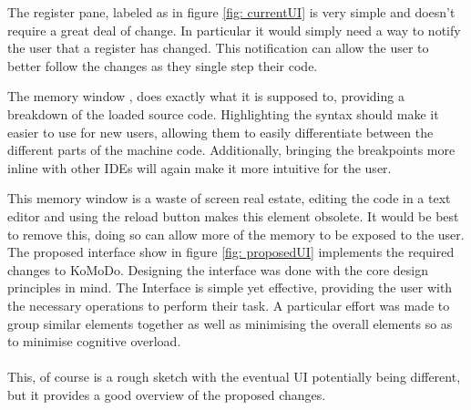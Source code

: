 The register pane, labeled as  in figure \ref{fig: currentUI} is very simple and doesn't require a great deal of change. In particular it would simply need a way to notify the user that a register has changed. This notification can allow the user to better follow the changes as they single step their code.

The memory window , does exactly what it is supposed to, providing a breakdown of the loaded source code. Highlighting the syntax should make it easier to use for new users, allowing them to easily differentiate between the different parts of the machine code. Additionally, bringing the breakpoints more inline with other IDEs will again make it more intuitive for the user.

This memory window is a waste of screen real estate, editing the code in a text editor and using the reload button makes this element obsolete. It would be best to remove this, doing so can allow more of the memory to be exposed to the user.
The proposed interface show in figure \ref{fig: proposedUI} implements the required changes to KoMoDo. Designing the interface was done with the core design principles \cite{design_principles} in mind. The Interface is simple yet effective, providing the user with the necessary operations to perform their task. A particular effort was made to group similar elements together as well as minimising the overall elements so as to minimise cognitive overload.\\\\
%
This, of course is a rough sketch with the eventual UI potentially being different, but it provides a good overview of the proposed changes.
